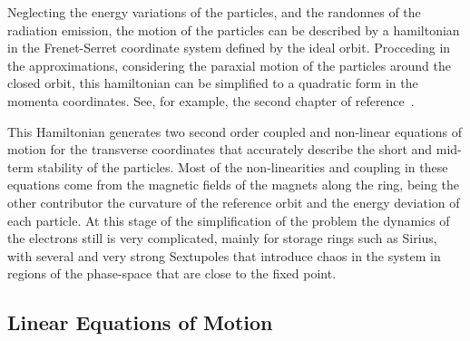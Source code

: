     Neglecting the energy variations of the particles, and the randonnes of the radiation emission, the motion of the particles can be described by a hamiltonian in the Frenet-Serret coordinate system defined by the ideal orbit. Procceding in the approximations, considering the paraxial motion of the particles around the closed orbit, this hamiltonian can be simplified to a quadratic form in the momenta coordinates. See, for example, the second chapter of reference~\cite[pp. 32]{Lee1999}.

    This Hamiltonian generates two second order coupled and non-linear equations of motion for the transverse coordinates that accurately describe the short and mid-term stability of the particles. Most of the non-linearities and coupling in these equations come from the magnetic fields of the magnets along the ring, being the other contributor the curvature of the reference orbit and the energy deviation of each particle. At this stage of the simplification of the problem the dynamics of the electrons still is very complicated, mainly for storage rings such as Sirius, with several and very strong Sextupoles that introduce chaos in the system in regions of the phase-space that are close to the fixed point.

\subsection{Linear Equations of Motion}

